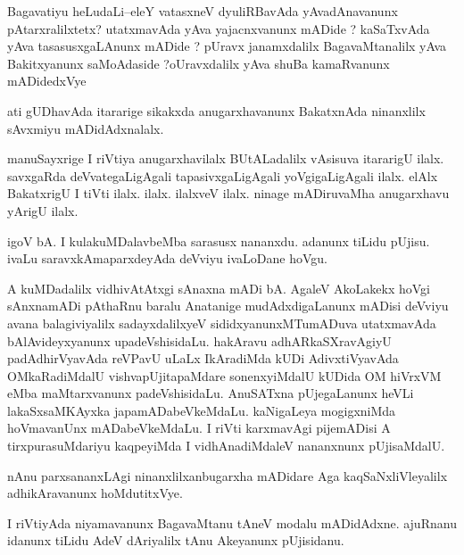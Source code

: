 \documentclass{article}
\begin{document}
\begin{mn}%
Bagavatiyu heLudaLi--eleY vatasxneV dyuliRBavAda yAvadAnavanunx pAtarxralilxtetx? 
utatxmavAda yAva yajacnxvanunx mADide ? kaSaTxvAda yAva tasasusxgaLAnunx mADide ? pUravx 
janamxdalilx BagavaMtanalilx yAva Bakitxyanunx saMoAdaside ?oUravxdalilx yAva shuBa 
kamaRvanunx mADidedxVye
\end{mn}

\begin{mn}%
ati gUDhavAda itararige sikakxda anugarxhavanunx BakatxnAda ninanxlilx sAvxmiyu 
mADidAdxnalalx.
\end{mn}

\begin{mn}%
manuSayxrige I riVtiya anugarxhavilalx BUtALadalilx vAsisuva itararigU ilalx. savxgaRda 
deVvategaLigAgali tapasivxgaLigAgali yoVgigaLigAgali ilalx. elAlx BakatxrigU I tiVti 
ilalx. ilalx. ilalxveV ilalx. ninage mADiruvaMha anugarxhavu yArigU ilalx.
\end{mn}

\begin{mn}%
igoV bA. I kulakuMDalavbeMba sarasusx nananxdu. adanunx tiLidu pUjisu. ivaLu 
saravxkAmaparxdeyAda deVviyu ivaLoDane hoVgu.
\end{mn}

\begin{mn}%
A kuMDadalilx vidhivAtAtxgi sAnaxna mADi bA. AgaleV AkoLakekx hoVgi sAnxnamADi pAthaRnu 
baralu  Anatanige mudAdxdigaLanunx  mADisi deVviyu avana balagiviyalilx sadayxdalilxyeV 
sididxyanunxMTumADuva utatxmavAda bAlAvideyxyanunx upadeVshisidaLu. hakAravu 
adhARkaSXravAgiyU padAdhirVyavAda reVPavU uLaLx IkAradiMda kUDi AdivxtiVyavAda 
OMkaRadiMdalU vishvapUjitapaMdare sonenxyiMdalU kUDida OM hiVrxVM  eMba maMtarxvanunx 
padeVshisidaLu. AnuSATxna pUjegaLanunx heVLi lakaSxsaMKAyxka japamADabeVkeMdaLu. 
kaNigaLeya mogigxniMda hoVmavanUnx mADabeVkeMdaLu. I riVti karxmavAgi pijemADisi A 
tirxpurasuMdariyu kaqpeyiMda I vidhAnadiMdaleV nananxnunx pUjisaMdalU.
\end{mn}

\begin{mn}%
nAnu parxsananxLAgi ninanxlilxanbugarxha mADidare Aga kaqSaNxliVleyalilx adhikAravanunx 
hoMdutitxVye.
\end{mn}

\begin{mn}%
I riVtiyAda niyamavanunx BagavaMtanu tAneV modalu mADidAdxne. ajuRnanu idanunx tiLidu AdeV 
dAriyalilx tAnu Akeyanunx pUjisidanu.
\end{mn}
\end{document}
